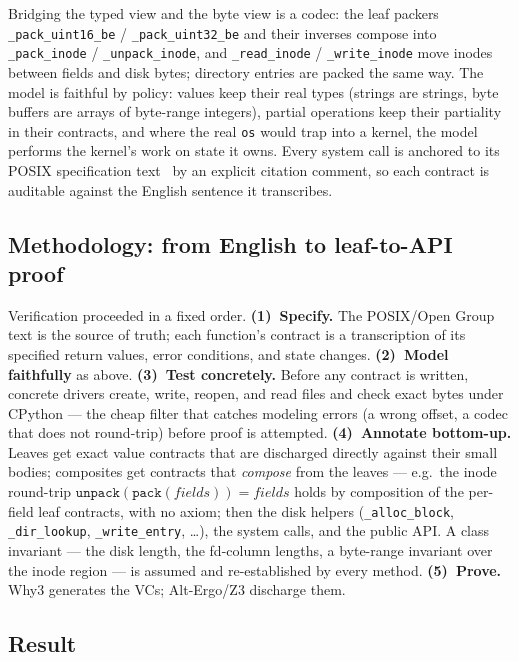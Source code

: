 \documentclass[11pt]{article}
\newcommand{\why}{\textsf{Why3}}
\newcommand{\altergo}{\textsf{Alt-Ergo}}
\newcommand{\zthree}{\textsf{Z3}}
\newcommand{\osmod}{\texttt{os}}
\begin{document}
Bridging the typed view and the byte view is a codec: the leaf packers
\texttt{\_pack\_uint16\_be} / \texttt{\_pack\_uint32\_be} and their inverses
compose into \texttt{\_pack\_inode} / \texttt{\_unpack\_inode}, and
\texttt{\_read\_inode} / \texttt{\_write\_inode} move inodes between fields
and disk bytes; directory entries are packed the same way. The model is
faithful by policy: values keep their real types (strings are strings, byte
buffers are arrays of byte-range integers), partial operations keep their
partiality in their contracts, and where the real \osmod{} would trap into a
kernel, the model performs the kernel's work on state it owns. Every system
call is anchored to its POSIX specification text~\cite{posix} by an explicit
citation comment, so each contract is auditable against the English sentence
it transcribes.

\subsection{Methodology: from English to leaf-to-API proof}

Verification proceeded in a fixed order.
\textbf{(1)~Specify.} The POSIX/Open Group text is the source of truth; each
function's contract is a transcription of its specified return values, error
conditions, and state changes.
\textbf{(2)~Model faithfully} as above.
\textbf{(3)~Test concretely.} Before any contract is written, concrete
drivers create, write, reopen, and read files and check exact bytes under
CPython --- the cheap filter that catches modeling errors (a wrong offset, a
codec that does not round-trip) before proof is attempted.
\textbf{(4)~Annotate bottom-up.} Leaves get exact value contracts that are
discharged directly against their small bodies; composites get contracts that
\emph{compose} from the leaves --- e.g.\ the inode round-trip
$\texttt{unpack}(\texttt{pack}(\mathit{fields})) = \mathit{fields}$ holds by
composition of the per-field leaf contracts, with no axiom; then the disk
helpers (\texttt{\_alloc\_block}, \texttt{\_dir\_lookup},
\texttt{\_write\_entry}, \ldots), the system calls, and the public API. A
class invariant --- the disk length, the fd-column lengths, a byte-range
invariant over the inode region --- is assumed and re-established by every
method.
\textbf{(5)~Prove.} \why{} generates the VCs; \altergo{}/\zthree{} discharge
them.

\subsection{Result}
\end{document}
